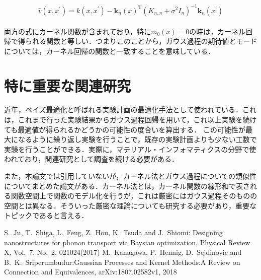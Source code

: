 \documentclass[10pt,onecolumn]{jsarticle}
\begin{document}
	\begin{align}
		\begin{aligned}
\hat{v}\left(x, x^{\prime}\right)= k\left(x, x^{\prime}\right) -\boldsymbol{k}_{n}(x)^{\mathrm{T}}\left(K_{n, n}+\sigma^{2} I_{n}\right)^{-1} \boldsymbol{k}_{n}\left(x^{\prime}\right)
\end{aligned}
	\end{align}

両方の式にカーネル関数が含まれており，特に$m_{0}(x) = 0$の時は，カーネル回帰で得られる関数と等しい．つまりこのことから，ガウス過程の期待値とモードについては，カーネル回帰の関数と一致することを意味している．

\section{特に重要な関連研究}
近年，ベイズ最適化と呼ばれる実験計画の最適化手法として使われている．これは，これまで行った実験結果からガウス過程回帰を用いて，これ以上実験を続けても最適値が得られるかどうかの可能性の度合いを算出する．	この可能性が最大になるように繰り返し実験を行うことで，既存の実験計画よりも少ない工数で実験を行うことができる．実際に，マテリアル・インフォマティクスの分野\cite{ref1}で使われており，関連研究として調査を続ける必要がある．

また，本論文では引用していないが，カーネル法とガウス過程についての類似性についてまとめた論文がある\cite{ref2}．カーネル法とは，カーネル関数の線形和で表される関数空間上で関数のモデル化を行うが，これは厳密にはガウス過程そのものの空間とは異なる．そういった厳密な理論についても研究する必要があり，重要なトピックであると言える．
\begin{thebibliography}{99}
%
	S.~Ju, T.~Shiga, L.~Feug, Z.~Hou, K.~Tsuda and J.~Shiomi: Designing nanostructures for phonon transport via Baysian optimization, Physical Review X, Vol.~7, No.~2, 021024(2017)
	M.~Kanagawa, P.~Hennig, D.~Sejdinovic and B.~K.~Sriperumbudur:Gaussian Processes and Kernel Methods:A Review on Connection and Equivalences, arXiv:1807.02582v1, 2018
%
\end{thebibliography}



\end{document}
